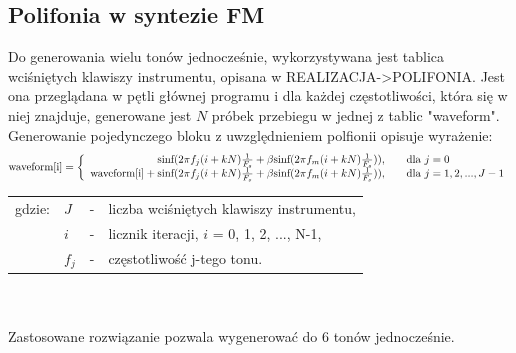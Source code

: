 \subsection{Polifonia w syntezie FM}
Do generowania wielu tonów jednocześnie, wykorzystywana jest tablica wciśniętych klawiszy instrumentu, opisana w REALIZACJA->POLIFONIA. Jest ona przeglądana w pętli głównej programu i dla każdej częstotliwości, która się w niej znajduje, generowane jest $N$ próbek przebiegu w jednej z tablic "waveform". Generowanie pojedynczego bloku z uwzględnieniem polfionii opisuje wyrażenie:
\begin{equation} \label{equ:fm_wzor4}
\text{waveform[i]} =\left \{\begin{array}{ r l }
\text{sinf}(2\pi f_j(i+kN)\frac{1}{F_s} + \beta \text{sinf}(2 \pi f_m(i+kN)\frac{1}{F_s})), & \quad \text{dla } j = 0\\
\text{waveform[i]} + \text{sinf}(2\pi f_j(i+kN)\frac{1}{F_s} + \beta \text{sinf}(2 \pi f_m(i+kN)\frac{1}{F_s})), & \quad  \text{dla } j = 1, 2, ..., J-1
\end{array}
\right.
\end{equation}
\begin{tabular}{ l l l l}
	gdzie: & $J$ &  - & liczba wciśniętych klawiszy instrumentu, \\
		&	$i$ & - & licznik iteracji, $i$ = 0, 1, 2, ..., N-1,\\
		&	$f_j$ & - & częstotliwość j-tego tonu.\\
\end{tabular} \\ \\

Zastosowane rozwiązanie pozwala wygenerować do 6 tonów jednocześnie. 

